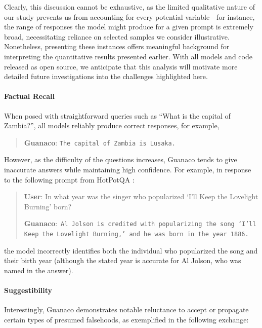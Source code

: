 Clearly, this discussion cannot be exhaustive, as the limited qualitative nature of our study prevents us from accounting for every potential variable—for instance, the range of responses the model might produce for a given prompt is extremely broad, necessitating reliance on selected samples we consider illustrative. Nonetheless, presenting these instances offers meaningful background for interpreting the quantitative results presented earlier. With all models and code released as open source, we anticipate that this analysis will motivate more detailed future investigations into the challenges highlighted here.

\paragraph{Factual Recall} When posed with straightforward queries such as ``What is the capital of Zambia?'', all models reliably produce correct responses, for example,

\begin{quote} 
    \textbf{Guanaco}:
    \texttt{The capital of Zambia is Lusaka.}
\end{quote}

However, as the difficulty of the questions increases, {Guanaco} tends to give inaccurate answers while maintaining high confidence. For example, in response to the following prompt from HotPotQA \citep{yang2018hotpotqa}:

\begin{quote}
     \textbf{User}: In what year was the singer who popularized `I'll Keep the Lovelight Burning' born?  

     \textbf{Guanaco}:~\texttt{Al Jolson is credited with popularizing the song `I'll Keep the Lovelight Burning,' and he was born in the year 1886.}
 \end{quote}

the model incorrectly identifies both the individual who popularized the song and their birth year (although the stated year is accurate for Al Jolson, who was named in the answer).

\paragraph{Suggestibility} Interestingly, {Guanaco} demonstrates notable reluctance to accept or propagate certain types of presumed falsehoods, as exemplified in the following exchange:

